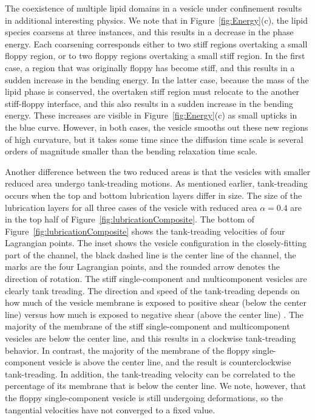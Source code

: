\documentclass[twoside,twocolumn,9pt]{article}
\begin{document}
The coexistence of multiple lipid domains in a vesicle under confinement
results in additional interesting physics. We note that in
Figure~\ref{fig:Energy}(c), the lipid species coarsens at three
instances, and this results in a decrease in the phase energy. Each
coarsening corresponds either to two stiff regions overtaking a small
floppy region, or to two floppy regions overtaking a small stiff region.
In the first case, a region that was originally floppy has become stiff,
and this results in a sudden increase in the bending energy. In the
latter case, because the mass of the lipid phase is conserved, the
overtaken stiff region must relocate to the another stiff-floppy
interface, and this also results in a sudden increase in the bending
energy. These increases are visible in Figure~\ref{fig:Energy}(c) as
small upticks in the blue curve. However, in both cases, the vesicle
smooths out these new regions of high curvature, but it takes some time
since the diffusion time scale is several orders of magnitude smaller
than the bending relaxation time scale.

Another difference between the two reduced areas is that the vesicles
with smaller reduced area undergo tank-treading motions. As mentioned
earlier, tank-treading occurs when the top and bottom lubrication layers
differ in size. The size of the lubrication layers for all three cases
of the vesicle with reduced area $\alpha = 0.4$ are in the top half of
Figure~\ref{fig:lubricationComposite}. The bottom of
Figure~\ref{fig:lubricationComposite} shows the tank-treading velocities
of four Lagrangian points. The inset shows the vesicle configuration in
the closely-fitting part of the channel, the black dashed line is the
center line of the channel, the marks are the four Lagrangian points,
and the rounded arrow denotes the direction of rotation. The stiff
single-component and multicomponent vesicles are clearly tank treading.
The direction and speed of the tank-treading depends on how much of
the vesicle membrane is exposed to positive shear (below the center
line) versus how much is exposed to negative shear (above the center
line) \cite{kao-bir-mis2009}. The majority of the membrane of the stiff single-component and
multicomponent vesicles are below the center line, and this results in a
clockwise tank-treading behavior. In contrast, the majority of the
membrane of the floppy single-component vesicle is above the center
line, and the result is counterclockwise tank-treading. In addition, the
tank-treading velocity can be correlated to the percentage of its
membrane that is below the center line. We note, however, that the
floppy single-component vesicle is still undergoing deformations, so the
tangential velocities have not converged to a fixed value.
\end{document}
